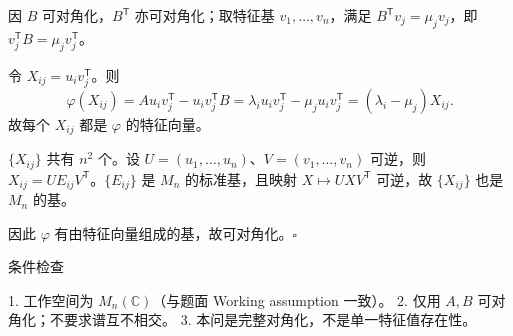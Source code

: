 \documentclass[
    lang=cn,
    color=blue,
    mode=fancy,
    thmcnt=section,
    scheme=chinese
]{elegantbook}
\begin{document}
因 $B$ 可对角化，$B^{\mathsf T}$ 亦可对角化；取特征基 $v_1,\ldots,v_n$，满足 $B^{\mathsf T}v_j=\mu_j v_j$，即 $v_j^{\mathsf T}B=\mu_j v_j^{\mathsf T}$。

令 $X_{ij}=u_i v_j^{\mathsf T}$。则
\[
\varphi(X_{ij})=A u_i v_j^{\mathsf T}-u_i v_j^{\mathsf T}B=\lambda_i u_i v_j^{\mathsf T}-\mu_j u_i v_j^{\mathsf T}=(\lambda_i-\mu_j)X_{ij}.
\]
故每个 $X_{ij}$ 都是 $\varphi$ 的特征向量。

$\{X_{ij}\}$ 共有 $n^2$ 个。设 $U=(u_1,\ldots,u_n)$、$V=(v_1,\ldots,v_n)$ 可逆，则 $X_{ij}=U E_{ij} V^{\mathsf T}$。$\{E_{ij}\}$ 是 $M_n$ 的标准基，且映射 $X\mapsto UXV^{\mathsf T}$ 可逆，故 $\{X_{ij}\}$ 也是 $M_n$ 的基。

因此 $\varphi$ 有由特征向量组成的基，故可对角化。$\square$

条件检查

1. 工作空间为 $M_n(\mathbb{C})$（与题面 Working assumption 一致）。
2. 仅用 $A,B$ 可对角化；不要求谱互不相交。
3. 本问是完整对角化，不是单一特征值存在性。
\end{document}
